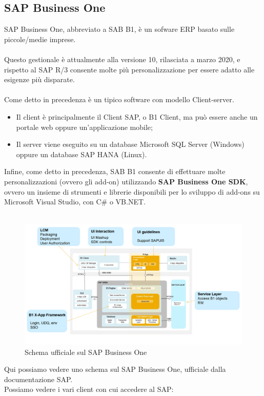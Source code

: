 \subsection{SAP Business One}
SAP Business One, abbreviato a SAB B1, è un sofware ERP basato sulle piccole/medie imprese.
\\\\Questo gestionale è attualmente alla versione 10, rilasciata a marzo 2020, e rispetto al SAP R/3 consente molte più personalizzazione per essere adatto alle esigenze più disparate.
\\\\Come detto in precedenza è un tipico software con modello Client-server.
\begin{itemize}
	\item Il client è principalmente il Client SAP, o B1 Client, ma può essere anche un portale web oppure un'applicazione mobile;
	\item Il server viene eseguito su un database Microsoft SQL Server (Windows) oppure un database SAP HANA (Linux).\\
\end{itemize}
Infine, come detto in precedenza, SAB B1 consente di effettuare molte personalizzazioni (ovvero gli add-on) utilizzando \textbf{SAP Business One SDK}, ovvero un insieme di strumenti e librerie disponibili per lo sviluppo di add-ons su Microsoft Visual Studio, con C\# o VB.NET.\\\\
\begin{figure}[!h] 
	\includegraphics[scale = 0.4, left]{immagini/erp-sap-inside.png} 
	\caption{Schema ufficiale sul SAP Business One}
\end{figure}
\newpage
\begin{flushleft}
	Qui possiamo vedere uno schema sul SAP Business One, ufficiale dalla documentazione SAP.\\
	Possiamo vedere i vari client con cui accedere al SAP:
\end{flushleft}

